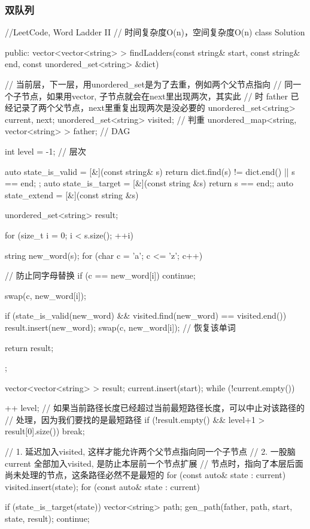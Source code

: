 \subsubsection{双队列}

\begin{Code}
//LeetCode, Word Ladder II
// 时间复杂度O(n)，空间复杂度O(n)
class Solution {
public:
    vector<vector<string> > findLadders(const string& start,
            const string& end, const unordered_set<string> &dict) {
        // 当前层，下一层，用unordered_set是为了去重，例如两个父节点指向
        // 同一个子节点，如果用vector, 子节点就会在next里出现两次，其实此
        // 时 father 已经记录了两个父节点，next里重复出现两次是没必要的
        unordered_set<string> current, next;
        unordered_set<string> visited; // 判重
        unordered_map<string, vector<string> > father; // DAG

        int level = -1;  // 层次

        auto state_is_valid = [&](const string& s) {
            return dict.find(s) != dict.end() || s == end;
        };
        auto state_is_target = [&](const string &s) {return s == end;};
        auto state_extend = [&](const string &s) {
            unordered_set<string> result;

            for (size_t i = 0; i < s.size(); ++i) {
                string new_word(s);
                for (char c = 'a'; c <= 'z'; c++) {
                    // 防止同字母替换
                    if (c == new_word[i]) continue;

                    swap(c, new_word[i]);

                    if (state_is_valid(new_word) &&
                            visited.find(new_word) == visited.end()) {
                        result.insert(new_word);
                    }
                    swap(c, new_word[i]); // 恢复该单词
                }
            }

            return result;
        };

        vector<vector<string> > result;
        current.insert(start);
        while (!current.empty()) {
            ++ level;
            // 如果当前路径长度已经超过当前最短路径长度，可以中止对该路径的
            // 处理，因为我们要找的是最短路径
            if (!result.empty() && level+1 > result[0].size()) break;

            // 1. 延迟加入visited, 这样才能允许两个父节点指向同一个子节点
            // 2. 一股脑current 全部加入visited, 是防止本层前一个节点扩展
            // 节点时，指向了本层后面尚未处理的节点，这条路径必然不是最短的
            for (const auto& state : current)
                visited.insert(state);
            for (const auto& state : current) {
                if (state_is_target(state)) {
                    vector<string> path;
                    gen_path(father, path, start, state, result);
                    continue;
                }

}}}}
\end{Code}
